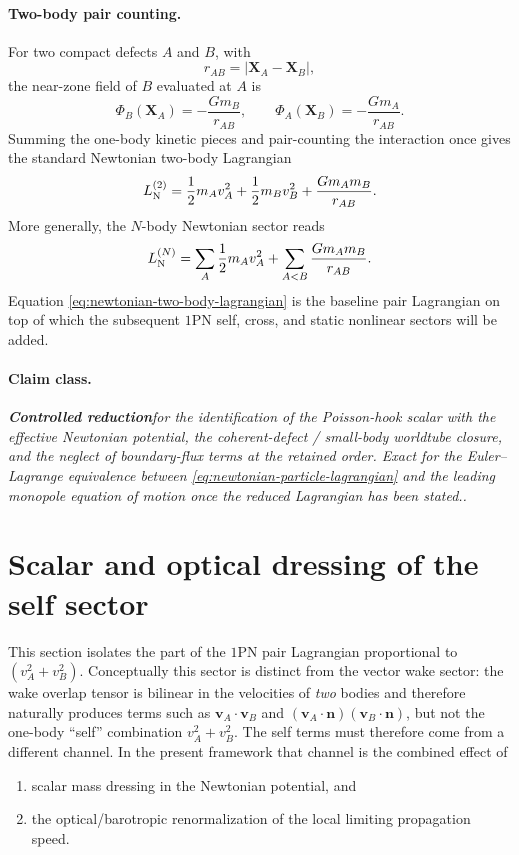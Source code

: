 \documentclass[11pt]{article}
\newcommand{\vct}{\mathbf v}
\newcommand{\nvec}{\mathbf n}
\newcommand{\Controlled}{\textbf{Controlled reduction}}
\newcommand{\claimclass}[1]{\paragraph{Claim class.}\emph{#1.}}
\begin{document}
\paragraph{Two-body pair counting.}
For two compact defects \(A\) and \(B\), with
\begin{equation}
r_{AB}=|\mathbf X_A-\mathbf X_B|,
\end{equation}
the near-zone field of \(B\) evaluated at \(A\) is
\begin{equation}
\Phi_B(\mathbf X_A)=-\frac{Gm_B}{r_{AB}},
\qquad
\Phi_A(\mathbf X_B)=-\frac{Gm_A}{r_{AB}}.
\end{equation}
Summing the one-body kinetic pieces and pair-counting the interaction once gives the
standard Newtonian two-body Lagrangian
\begin{equation}
L_{\rm N}^{(2)}
=
\frac12 m_A v_A^2
+
\frac12 m_B v_B^2
+
\frac{Gm_A m_B}{r_{AB}}.
\label{eq:newtonian-two-body-lagrangian}
\end{equation}
More generally, the \(N\)-body Newtonian sector reads
\begin{equation}
L_{\rm N}^{(N)}
=
\sum_A \frac12 m_A v_A^2
+
\sum_{A<B}\frac{Gm_A m_B}{r_{AB}}.
\label{eq:newtonian-nbody-lagrangian}
\end{equation}
Equation \eqref{eq:newtonian-two-body-lagrangian} is the baseline pair Lagrangian on top
of which the subsequent \(1\)PN self, cross, and static nonlinear sectors will be added.

\claimclass{\Controlled for the identification of the Poisson-hook scalar with the
effective Newtonian potential, the coherent-defect / small-body worldtube closure, and
the neglect of boundary-flux terms at the retained order. Exact for the Euler--Lagrange
equivalence between \cref{eq:newtonian-particle-lagrangian} and the leading monopole
equation of motion once the reduced Lagrangian has been stated.}


\section{Scalar and optical dressing of the self sector}
\label{sec:self-sector}

This section isolates the part of the \(1\)PN pair Lagrangian proportional to
\((v_A^2+v_B^2)\). Conceptually this sector is distinct from the vector wake sector:
the wake overlap tensor is bilinear in the velocities of \emph{two} bodies and therefore
naturally produces terms such as \(\vct_A\!\cdot\!\vct_B\) and
\((\vct_A\!\cdot\!\nvec)(\vct_B\!\cdot\!\nvec)\), but not the one-body ``self''
combination \(v_A^2+v_B^2\). The self terms must therefore come from a different
channel. In the present framework that channel is the combined effect of
\begin{enumerate}[leftmargin=1.5em]
  \item scalar mass dressing in the Newtonian potential, and
  \item the optical/barotropic renormalization of the local limiting propagation speed.
\end{enumerate}
\end{document}

